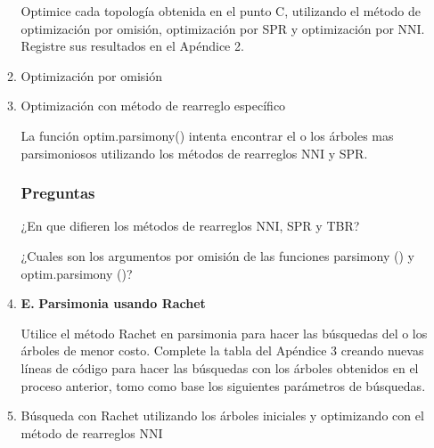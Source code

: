 \begin{itemize}
\begin{enumerate}
Optimice cada topolog\'ia obtenida en el punto C,  utilizando el m\'etodo de optimización por omisión,  optimización por SPR y optimización por NNI. Registre sus resultados en el Ap\'endice 2.

\item Optimización por omisión








\item Optimización con m\'etodo de rearreglo espec\'ifico





\normalsize

La funci\'on optim.parsimony() intenta encontrar el o los \'arboles mas parsimoniosos utilizando los m\'etodos de rearreglos NNI y SPR.

\subsubsection*{Preguntas}

¿En que difieren los m\'etodos de rearreglos NNI,  SPR y TBR?

¿Cuales  son los argumentos por omisi\'on de las funciones parsimony () y optim.parsimony ()?\\

\item{\textbf{E. }}\textbf{Parsimonia usando Rachet} 



Utilice el m\'etodo Rachet en parsimonia para hacer las b\'usquedas del o los \'arboles de menor costo. Complete la tabla del Ap\'endice 3 creando nuevas l\'ineas de c\'odigo para hacer las b\'usquedas con los \'arboles obtenidos en el proceso anterior,  tomo como base los siguientes par\'ametros de b\'usquedas.

\item B\'usqueda con Rachet utilizando los \'arboles iniciales y optimizando con el m\'etodo de rearreglos NNI




\end{enumerate}
\end{itemize}
